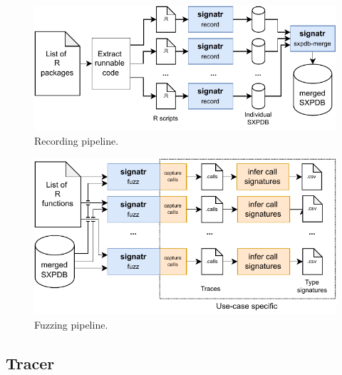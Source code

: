 \documentclass[sigplan,nonacm,anonymous,review]{acmart}
\begin{document}
\begin{figure}
    \centering
    \includegraphics[width=\columnwidth]{code-and-figures/sxdb-pipeline.pdf}
    \caption{
    Recording pipeline.
    }\label{fig:sxpdb-pipeline}
\end{figure}

\begin{figure}
    \centering
    \includegraphics[width=\columnwidth]{code-and-figures/fuzz-pipeline.pdf}
    \caption{
    Fuzzing pipeline.
    }\label{fig:fuzz-pipeline}
\end{figure}

\subsection{Tracer}\label{sec:argtracer}
\end{document}
